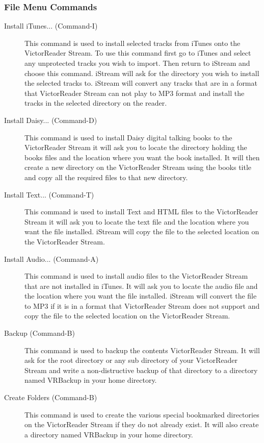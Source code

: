 \documentclass[12pt]{article}
\begin{document}
\subsubsection{File Menu Commands}
\begin{description}
\item[ Install iTunes... (Command-I)] This command is used to install selected tracks from iTunes onto the VictorReader Stream. To use this command first go to iTunes and select any unprotected tracks you wish to import. Then return to iStream and choose this command. iStream will ask for the directory you wish to install the selected tracks to. iStream will convert any tracks that are in a format that VictorReader Stream can not play to MP3 format and install the tracks in the selected directory on the reader.
\item[ Install Daisy... (Command-D)] This command is used to install Daisy digital talking books to the VictorReader Stream it will ask you to locate the directory holding the books files and the location where you want the book installed. It will then create a new directory on the VictorReader Stream using the books title and copy all the required files to that new directory.
\item[ Install Text... (Command-T)] This command is used to install Text and HTML files to the VictorReader Stream it will ask you to locate the text file and the location where you want the file installed. iStream will copy the file to the selected location on the VictorReader Stream.
\item[ Install Audio... (Command-A)] This command is used to install audio files to the VictorReader Stream that are not installed in iTunes. It will ask you to locate the audio file and the location where you want the file installed. iStream will convert the file to MP3 if it is in a format that VictorReader Stream does not support and copy the file to the selected location on the VictorReader Stream.
\item[ Backup (Command-B)] This command is used to backup the contents VictorReader Stream. It will ask for the root directory or any sub directory of your VictorReader Stream and write a non-distructive backup of that directory to a directory named VRBackup in your home directory.
\item[ Create Folders (Command-B)] This command is used to create the various special bookmarked directories on the VictorReader Stream if they do not already exist. It will also create a directory named VRBackup in your home directory.
\end{description}
\end{document}
